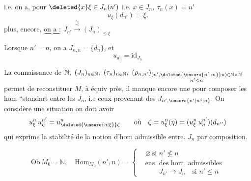 i.e. on a, pour \(\deleted{x}\xi\in J_n(n')\) i.e. \(x\in J_n,\ \tau_n(x)=n'\)
\[
 u_\xi(d_{n'})=\xi .
\]
 plus,  encore, \(\underbrace{\text{on a :}}\)  \(J_{n'}\xrightarrow{\overset{u_\xi}{\sim}}(J_n)_{\leq\xi}\)

Lorsque \(n'=n\), on a \(J_{n,n}=\{d_n\}\), et
\[
 u_{d_n}=\mathrm{id}_{J_n}
\]

La connaissance de \(\mathbb N,\ (J_n)_{n\in\mathbb N},\ (\tau_n)_{n\in\mathbb N},\
(\rho_{n,n'})_{\substack{(n',\deleted{\unsure{n'|m}}n)\in\mathbb N\times\mathbb N\\ n'\leq n}}\) permet de reconstituer   \(M\), à  équiv près, il manque encore une   pour composer les hom ``standart entre les \(J_n\), i.e ceux provenant des \(J_{n',\unsure{n'|n^{4}|n}}\).  On considère une situation
on doit avoir
\[
 u_\xi^n\,u_\eta^{n'}=u_{\deleted{\unsure{a|\xi}}\zeta}^{n}
 \qquad\text{où}\quad \zeta=u_\xi^n(\eta)=
 (u_\xi^n\,u_\eta^{n'})(d_{n''})
\]
qui exprime la  stabilité de la notion d'hom admissible entre. \(J_n\) par composition.

 
\[
 \mathrm{Ob}\,M_0=\mathbb N,\quad \mathrm{Hom}_{M_0}(n',n)=
 \left\{\begin{aligned}
 &\varnothing\ \text{si }n'\nleq n\\
 &\text{ens. des hom. admissibles}\\
 &\qquad J_{n'}\to J_n\quad\text{si }n'\leq n
 \end{aligned}\right.
\]
